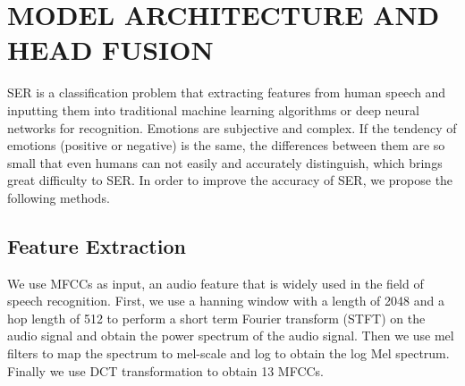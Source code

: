 \documentclass[10pt, conference, compsocconf]{IEEEtran}
\begin{document}
\section{MODEL ARCHITECTURE AND HEAD FUSION}
SER is a classification problem that extracting features from human speech and inputting them into traditional machine learning algorithms or deep neural networks for recognition. Emotions are subjective and complex. If the tendency of emotions (positive or negative) is the same, the differences between them are so small that even humans can not easily and accurately distinguish, which brings great difficulty to SER. In order to improve the accuracy of SER, we propose the following methods.
\subsection{Feature Extraction}
We use MFCCs as input, an audio feature that is widely used in the field of speech recognition. First, we use a hanning window with a length of 2048 and a hop length of 512 to perform a short term Fourier transform (STFT) on the audio signal and obtain the power spectrum of the audio signal. Then we use mel filters to map the spectrum to mel-scale and log to obtain the log Mel spectrum. Finally we use DCT transformation to obtain 13 MFCCs.
\end{document}
